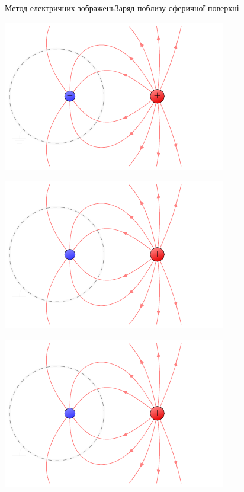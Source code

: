 \documentclass[onlytextwidth]{beamer}
\begin{document}
\begin{frame}{Метод електричних зображень}{Заряд поблизу сферичної поверхні}
\begin{overprint}
\begin{center}
		\end{center}
		\begin{center}
			\includegraphics[page=2]{mirrorsphere}
		\end{center}
		\begin{center}
			\includegraphics[page=3]{mirrorsphere}
		\end{center}
		\begin{center}
			\includegraphics[page=4]{mirrorsphere}
		\end{center}
	\end{overprint}
\end{frame}
\end{document}
